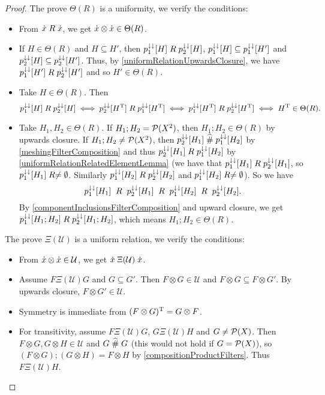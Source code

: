 \begin{proof}
The prove $\Theta(R)$ is a uniformity, we verify the conditions:
\begin{itemize}
\item From $\dot{x}\mathrel{R}\dot{x}$, we get $\dot{x}\otimes \dot{x}\in\Theta(R)$.
\item If $H\in\Theta(R)$ and $H\subseteq H'$, then $p_1^{\downarrow\downarrow}[H]\mathrel{R} p_2^{\downarrow\downarrow}[H]$, $p_1^{\downarrow\downarrow}[H]\subseteq p_1^{\downarrow\downarrow}[H']$ and $p_2^{\downarrow\downarrow}[H]\subseteq p_2^{\downarrow\downarrow}[H']$. Thus, by \ref{uniformRelationUpwardsClosure}, we have $p_1^{\downarrow\downarrow}[H']\mathrel{R} p_2^{\downarrow\downarrow}[H']$ and so $H'\in\Theta(R)$.
\item Take $H\in \Theta(R)$. Then
\[ p_1^{\downarrow\downarrow}[H]\mathrel{R} p_2^{\downarrow\downarrow}[H] \iff p_2^{\downarrow\downarrow}[H^{\mathrm{T}}]\mathrel{R} p_1^{\downarrow\downarrow}[H^{\mathrm{T}}] \iff p_1^{\downarrow\downarrow}[H^{\mathrm{T}}]\mathrel{R} p_2^{\downarrow\downarrow}[H^{\mathrm{T}}] \iff H^{\mathrm{T}}\in \Theta(R). \]
\item Take $H_1, H_2\in \Theta(R)$. If $H_1;H_2 = \operatorname{\mathcal{P}}(X^2)$, then $H_1;H_2\in\Theta(R)$ by upwards closure. If $H_1;H_2 \neq \operatorname{\mathcal{P}}(X^2)$, then $p_2^{\downarrow\downarrow}[H_1]\mathrel{\widehat{\#}} p_1^{\downarrow\downarrow}[H_2]$ by \ref{meshingFilterComposition} and thus $p_2^{\downarrow\downarrow}[H_1]\mathrel{R} p_1^{\downarrow\downarrow}[H_2]$ by \ref{uniformRelationRelatedElementLemma} (we have that $p_1^{\downarrow\downarrow}[H_1]\mathrel{R}p_2^{\downarrow\downarrow}[H_1]$, so $p_1^{\downarrow\downarrow}[H_1]\mathrel{R}\neq \emptyset$. Similarly $p_1^{\downarrow\downarrow}[H_2]\mathrel{R}p_2^{\downarrow\downarrow}[H_2]$ and $p_1^{\downarrow\downarrow}[H_2]\mathrel{R}\neq \emptyset$). So we have
\[ p_1^{\downarrow\downarrow}[H_1]\;\mathrel{R} \;p_2^{\downarrow\downarrow}[H_1] \;\mathrel{R} \;p_1^{\downarrow\downarrow}[H_2]\; \mathrel{R} \;p_2^{\downarrow\downarrow}[H_2]. \]
By \ref{componentInclusionsFilterComposition} and upward closure, we get $p_1^{\downarrow\downarrow}[H_1;H_2]\mathrel{R}p_2^{\downarrow\downarrow}[H_1;H_2]$, which means $H_1;H_2\in \Theta(R)$.
\end{itemize}

The prove $\Xi(\mathcal{U})$ is a uniform relation, we verify the conditions:
\begin{itemize}
\item From $\dot{x}\otimes \dot{x}\in\mathcal{U}$, we get $\dot{x}\mathrel{\Xi(\mathcal{U})}\dot{x}$.
\item Assume $F\mathrel{\Xi(\mathcal{U})}G$ and $G\subseteq G'$. Then $F\otimes G\in \mathcal{U}$ and $F\otimes G\subseteq F\otimes G'$. By upwards closure, $F\otimes G'\in\mathcal{U}$.
\item Symmetry is immediate from $(F\otimes G)^{\mathrm{T}} = G\otimes F$.
\item For transitivity, assume $F\mathrel{\Xi(\mathcal{U})}G$, $G\mathrel{\Xi(\mathcal{U})}H$ and $G \neq \operatorname{\mathcal{P}}(X)$. Then $F\otimes G, G\otimes H\in\mathcal{U}$ and $G \mathrel{\widehat{\#}} G$ (this would not hold if $G = \operatorname{\mathcal{P}}(X)$), so $(F\otimes G);(G\otimes H) = F\otimes H$ by \ref{compositionProductFilters}. Thus $F\mathrel{\Xi(\mathcal{U})}H$.
\end{itemize}


\end{proof}

